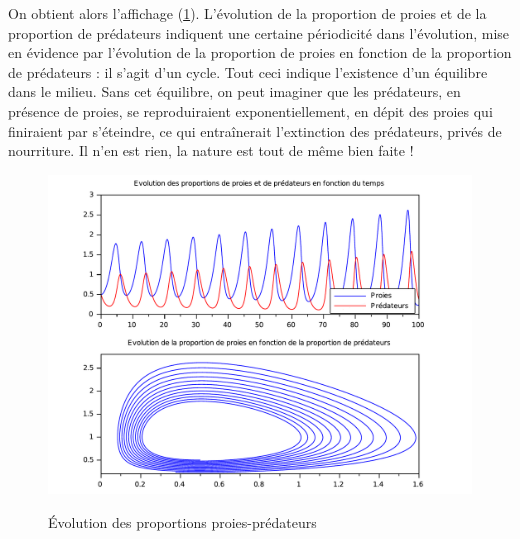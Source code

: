 \documentclass[a4paper,10pt]{report}
\begin{document}
On obtient alors l'affichage (\ref{aff_proie-predateur}). L'évolution de la proportion de proies et de la proportion de prédateurs indiquent une certaine périodicité dans l'évolution, mise en évidence par l'évolution de la proportion de proies en fonction de la proportion de prédateurs : il s'agit d'un cycle. Tout ceci indique l'existence d'un équilibre dans le milieu. Sans cet équilibre, on peut imaginer que les prédateurs, en présence de proies, se reproduiraient exponentiellement, en dépit des proies qui finiraient par s'éteindre, ce qui entraînerait l’extinction des prédateurs, privés de nourriture. Il n'en est rien, la nature est tout de même bien faite !
\begin{figure}[H]
\centering
\caption{Évolution des proportions proies-prédateurs}
\includegraphics[width=\textwidth]{proie-predateur.pdf}
\label{aff_proie-predateur}
\end{figure}
\end{document}
